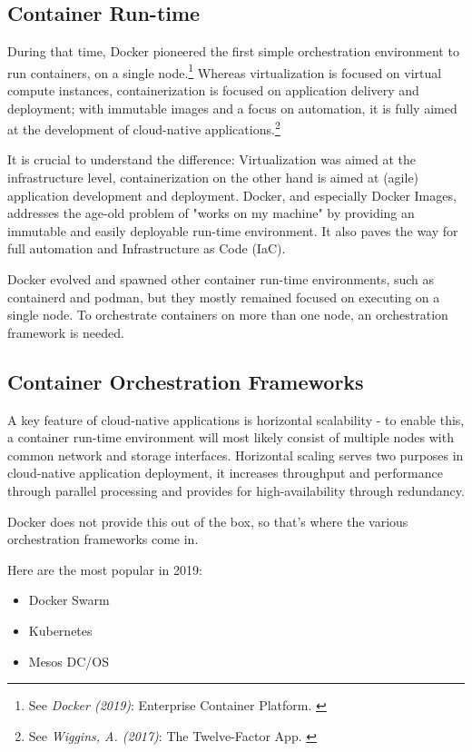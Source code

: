 \subsection{Container Run-time}

During that time, Docker pioneered the first simple orchestration environment to run containers, on a single node.\footnote{See \textit{Docker (2019)}: Enterprise Container Platform. \cite{docker}} Whereas virtualization is focused on virtual compute instances, containerization is focused on application delivery and deployment; with immutable images and a focus on automation, it is fully aimed at the development of cloud-native applications.\footnote{See \textit{Wiggins, A. (2017)}: The Twelve-Factor App. \cite{12factor}}

It is crucial to understand the difference: Virtualization was aimed at the infrastructure level, containerization on the other hand is aimed at (agile) application development and deployment. Docker, and especially Docker Images, addresses the age-old problem of "works on my machine" by providing an immutable and easily deployable run-time environment. It also paves the way for full automation and Infrastructure as Code (IaC).

Docker evolved and spawned other container run-time environments, such as containerd and podman, but they mostly remained focused on executing on a single node. To orchestrate containers on more than one node, an orchestration framework is needed. 

\subsection{Container Orchestration Frameworks}

A key feature of cloud-native applications is horizontal scalability - to enable this, a container run-time environment will most likely consist of multiple nodes with common network and storage interfaces. Horizontal scaling serves two purposes in cloud-native application deployment, it increases throughput and performance through parallel processing and provides for high-availability through redundancy.

Docker does not provide this out of the box, so that's where the various orchestration frameworks come in. 

Here are the most popular in 2019:
\begin{itemize}
\item Docker Swarm
\item Kubernetes
\item Mesos DC/OS
\end{itemize}

